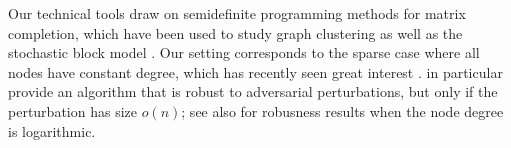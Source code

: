 

Our technical tools draw on semidefinite programming methods for matrix 
completion, which have been used to study graph clustering as well 
as the stochastic block model \citep{holland1983stochastic,condon2001algorithms}. 
Our setting corresponds to the sparse case where all nodes have constant degree, 
which has recently seen great interest \citep{decelle2011asymptotic,
mossel2012stochastic,mossel2013proof,mossel2013belief,
massoulie2014community,guedon2014community,mossel2015consistency,
chin2015stochastic,abbe2015community,makarychev2015learning}. 
\citet{makarychev2015learning} in particular provide an algorithm that is 
robust to adversarial perturbations, but only if the perturbation has 
size $o(n)$; see also \citet{cai2015robust} for robusness results when 
the node degree is logarithmic.

